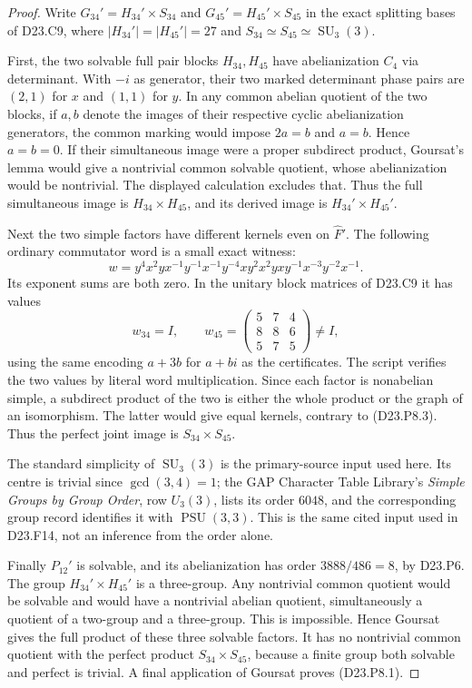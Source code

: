 \begin{proof}
Write $G_{34}'=H_{34}'\times S_{34}$ and
$G_{45}'=H_{45}'\times S_{45}$ in the exact splitting bases of
D23.C9, where $|H_{34}'|=|H_{45}'|=27$ and
$S_{34}\simeq S_{45}\simeq\operatorname{SU}_3(3)$.

First, the two solvable full pair blocks $H_{34},H_{45}$ have
abelianization $C_4$ via determinant. With $-i$ as generator,
their two marked determinant phase pairs are $(2,1)$ for $x$
and $(1,1)$ for $y$. In any common abelian quotient of the two
blocks, if $a,b$ denote the images of their respective cyclic
abelianization generators, the common marking would impose
$2a=b$ and $a=b$. Hence $a=b=0$. If their simultaneous image
were a proper subdirect product, Goursat's lemma would give a
nontrivial common solvable quotient, whose abelianization would
be nontrivial. The displayed calculation excludes that.
Thus the full simultaneous image is $H_{34}\times H_{45}$,
and its derived image is $H_{34}'\times H_{45}'$.

Next the two simple factors have different kernels even on
$\widehat F'$. The following ordinary commutator word is a
small exact witness:
\[
 w=y^4x^2yx^{-1}y^{-1}x^{-1}y^{-4}xy^2x^2yxy^{-1}x^{-3}y^{-2}x^{-1}.
\tag{D23.P8.2}
\]
Its exponent sums are both zero. In the unitary block matrices
of D23.C9 it has values
\[
 w_{34}=I,\qquad
 w_{45}=\begin{pmatrix}5&7&4\\8&8&6\\5&7&5\end{pmatrix}\ne I,
\tag{D23.P8.3}
\]
using the same encoding $a+3b$ for $a+bi$ as the certificates.
The script 
verifies the two values by literal word multiplication.
Since each factor is nonabelian simple, a subdirect product
of the two is either the whole product or the graph of an
isomorphism. The latter would give equal kernels, contrary
to (D23.P8.3). Thus the perfect joint image is
$S_{34}\times S_{45}$.

The standard simplicity of $\operatorname{SU}_3(3)$ is the
primary-source input used here. Its centre is trivial since
$\gcd(3,4)=1$; the GAP Character Table Library's
\emph{Simple Groups by Group Order}, row $U_3(3)$, lists its
order $6048$, and the corresponding group record identifies
it with $\operatorname{PSU}(3,3)$. This is the same cited
input used in D23.F14, not an inference from the order alone.

Finally $P_{12}'$ is solvable, and its abelianization has
order $3888/486=8$, by D23.P6. The group
$H_{34}'\times H_{45}'$ is a three-group. Any nontrivial
common quotient would be solvable and would have a nontrivial
abelian quotient, simultaneously a quotient of a two-group
and a three-group. This is impossible. Hence Goursat gives
the full product of these three solvable factors. It has no
nontrivial common quotient with the perfect product
$S_{34}\times S_{45}$, because a finite group both solvable
and perfect is trivial. A final application of Goursat proves
(D23.P8.1).


\end{proof}
